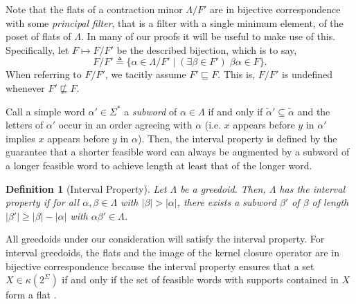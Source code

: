 \documentclass[11pt]{article}
\newtheorem{definition}[theorem]{Definition}
\newcommand{\univ}{\Sigma}
\newcommand{\glang}{\Lambda}
\begin{document}
Note that the flats of a contraction minor $\glang/F'$ are in bijective correspondence with some \emph{principal filter}, that is a filter with a single minimum element, of the poset of flats of $\glang$.
In many of our proofs it will be useful to make use of this.
Specifically, let $F\mapsto F/F'$ be the described bijection, which is to say,
\[
    F/F' \triangleq \{\alpha\in\glang/F'\mid (\exists \beta \in F')\;\beta\alpha \in F\}.
\]
When referring to $F/F'$, we tacitly assume $F'\sqsubseteq F$.
This is, $F/F'$ is undefined whenever $F'\not\sqsubseteq F$.

Call a simple word $\alpha'\in\univ^*$ a \emph{subword} of $\alpha\in\glang$ if and only if
$\widetilde{\alpha}' \subseteq \widetilde{\alpha}$ and the letters of $\alpha'$ occur in an order agreeing with $\alpha$ (i.e. $x$ appears before $y$ in $\alpha'$ implies $x$ appears before $y$ in $\alpha$).
Then, the interval property is defined by the guarantee that a shorter feasible word can always be augmented by a subword of a longer feasible word to achieve length at least that of the longer word.
\begin{definition}[Interval Property]
    Let $\glang$ be a greedoid.
    Then, $\glang$ has the \emph{interval property} if for all $\alpha ,\beta \in \glang$ with $|\beta| > |\alpha|$, there exists a subword $\beta'$ of $\beta$ of length $|\beta'| \geq |\beta| - |\alpha|$ with $\alpha \beta'\in\glang$.
\end{definition}
All greedoids under our consideration will satisfy the interval property.
For interval greedoids, the flats and the image of the kernel closure operator are in bijective correspondence because the interval property ensures that a set $X \in \kappa\left(2^\univ\right)$ if and only if the set of feasible words with supports contained in $X$ form a flat \cite{korte2012greedoids}.
\end{document}
